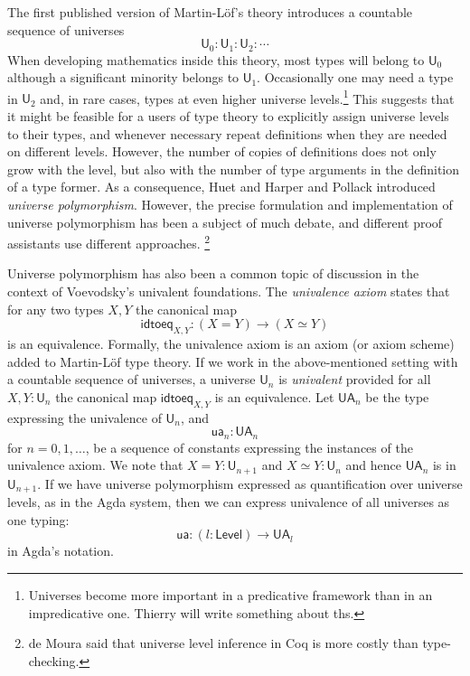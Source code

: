 \documentclass[11pt,a4paper]{article}
\def\UU{\mathsf{U}}
\def\Level{\mathsf{Level}}
\newcommand{\idtoeq}{\mathsf{idtoeq}}
\newcommand{\ua}{\mathsf{ua}}
\newcommand{\UA}{\mathsf{UA}}
\begin{document}
The first published version of Martin-Löf's theory \cite{martinlof:predicative} introduces a countable sequence of universes
$$
\UU_0 : \UU_1 : \UU_2 : \cdots
$$
When developing mathematics inside this theory, most types will belong to $\UU_0$ although a significant minority belongs to $\UU_1$. Occasionally one may need a type in $\UU_2$ and, in rare cases, types at even higher universe levels.\footnote{Universes become more important in a predicative framework than in an impredicative one. Thierry will write something about ths.} This suggests that it might be feasible for a users of type theory to explicitly assign universe levels to their types, and whenever necessary repeat definitions when they are needed on different levels. However, the number of copies of definitions does not only grow with the level, but also with the number of type arguments in the definition of a type former. As a consequence, Huet \cite{Huet87} and Harper and Pollack \cite{HarperP91} introduced {\em universe polymorphism}. However, the precise formulation and implementation of universe polymorphism has been a subject of much debate, and different proof assistants use different approaches. \footnote{de Moura said that universe level inference in Coq is more costly than type-checking.}


Universe polymorphism has also been a common topic of discussion in the context of Voevodsky's univalent foundations. The {\em univalence axiom} states that for any two types $X,Y$ the canonical map
$$
\idtoeq_{X,Y} : (X=Y)\to (X\simeq Y)
$$
is an equivalence. Formally, the univalence axiom is an axiom (or axiom scheme) added to Martin-Löf type theory. If we work in the above-mentioned setting with a countable sequence of universes, a universe $\UU_n$ is {\em univalent} provided for all $X,Y : \UU_n$ the canonical map $\idtoeq_{X,Y}$ is an equivalence. Let $\UA_n$ be the type expressing the univalence of $\UU_n$, and
$$
\ua_n : \UA_n
$$
for $n = 0,1,\ldots$, be a sequence of constants expressing the instances of the univalence axiom. We note that $X = Y : \UU_{n+1}$ and $X\simeq Y : \UU_n$ and hence $\UA_n$ is in $\UU_{n+1}$. If we have universe polymorphism expressed as quantification over universe levels, as in the Agda system, then we can express univalence of all universes as one typing:
$$
\ua : (l : \Level) \to \UA_l
$$
in Agda's notation.
\end{document}
